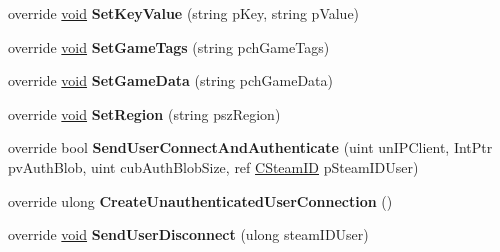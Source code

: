 \begin{DoxyCompactItemize}
\item 
\hypertarget{classValve_1_1Steamworks_1_1CSteamGameServer_a79edc329c5b3ed22db72cfd38e1ae4ce}{}override \hyperlink{SDL__audio_8h_a52835ae37c4bb905b903cbaf5d04b05f}{void} {\bfseries Set\+Key\+Value} (string p\+Key, string p\+Value)\label{classValve_1_1Steamworks_1_1CSteamGameServer_a79edc329c5b3ed22db72cfd38e1ae4ce}

\item 
\hypertarget{classValve_1_1Steamworks_1_1CSteamGameServer_a19acd2753fc8bea1577163bfd89f11d2}{}override \hyperlink{SDL__audio_8h_a52835ae37c4bb905b903cbaf5d04b05f}{void} {\bfseries Set\+Game\+Tags} (string pch\+Game\+Tags)\label{classValve_1_1Steamworks_1_1CSteamGameServer_a19acd2753fc8bea1577163bfd89f11d2}

\item 
\hypertarget{classValve_1_1Steamworks_1_1CSteamGameServer_a8c6e5c3c956140344f01b481d2ed626b}{}override \hyperlink{SDL__audio_8h_a52835ae37c4bb905b903cbaf5d04b05f}{void} {\bfseries Set\+Game\+Data} (string pch\+Game\+Data)\label{classValve_1_1Steamworks_1_1CSteamGameServer_a8c6e5c3c956140344f01b481d2ed626b}

\item 
\hypertarget{classValve_1_1Steamworks_1_1CSteamGameServer_aafcfb9c1e8b9c0b817b8db47425150bd}{}override \hyperlink{SDL__audio_8h_a52835ae37c4bb905b903cbaf5d04b05f}{void} {\bfseries Set\+Region} (string psz\+Region)\label{classValve_1_1Steamworks_1_1CSteamGameServer_aafcfb9c1e8b9c0b817b8db47425150bd}

\item 
\hypertarget{classValve_1_1Steamworks_1_1CSteamGameServer_aae2bab3a191484dfe53a277741c37743}{}override bool {\bfseries Send\+User\+Connect\+And\+Authenticate} (uint un\+I\+P\+Client, Int\+Ptr pv\+Auth\+Blob, uint cub\+Auth\+Blob\+Size, ref \hyperlink{structValve_1_1Steamworks_1_1CSteamID}{C\+Steam\+I\+D} p\+Steam\+I\+D\+User)\label{classValve_1_1Steamworks_1_1CSteamGameServer_aae2bab3a191484dfe53a277741c37743}

\item 
\hypertarget{classValve_1_1Steamworks_1_1CSteamGameServer_ae4f67ad0bdda471f148d8683fb3f4384}{}override ulong {\bfseries Create\+Unauthenticated\+User\+Connection} ()\label{classValve_1_1Steamworks_1_1CSteamGameServer_ae4f67ad0bdda471f148d8683fb3f4384}

\item 
\hypertarget{classValve_1_1Steamworks_1_1CSteamGameServer_abf2d557ac1ddb928d9f83a084e745a23}{}override \hyperlink{SDL__audio_8h_a52835ae37c4bb905b903cbaf5d04b05f}{void} {\bfseries Send\+User\+Disconnect} (ulong steam\+I\+D\+User)\label{classValve_1_1Steamworks_1_1CSteamGameServer_abf2d557ac1ddb928d9f83a084e745a23}


\end{DoxyCompactItemize}
